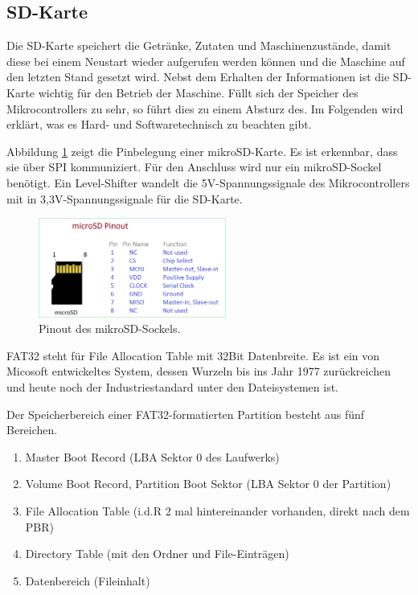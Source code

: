 \subsection{SD-Karte}
\label{subsec:SD-Karte}

Die SD-Karte speichert die Getränke, Zutaten und Maschinenzustände, damit diese bei einem Neustart wieder aufgerufen werden können und die Maschine auf den letzten Stand gesetzt wird.
Nebst dem Erhalten der Informationen ist die SD-Karte wichtig für den Betrieb der Maschine. Füllt sich der Speicher des Mikrocontrollers zu sehr, so führt dies zu einem Absturz des. Im Folgenden wird erklärt, was es Hard- und Softwaretechnisch zu beachten gibt.

Abbildung \ref{fig:micro_sd_pinout} zeigt die Pinbelegung einer mikroSD-Karte. Es ist erkennbar, dass sie über SPI kommuniziert. Für den Anschluss wird nur ein mikroSD-Sockel benötigt. Ein Level-Shifter wandelt die 5V-Spannungssignale des Mikrocontrollers mit in 3,3V-Spannungssignale für die SD-Karte.

\begin{figure}[H]
	\centering
	\includegraphics[width=0.55\textwidth]{graphics/micro-sd-pinout}
	\caption{Pinout des mikroSD-Sockels. \cite{theorycircuitcom_arduino_2018}}
	\label{fig:micro_sd_pinout}
\end{figure}

FAT32 steht für File Allocation Table mit 32Bit Datenbreite. Es ist ein von Micosoft entwickeltes System, dessen Wurzeln bis ins Jahr 1977 zurückreichen und heute noch der Industriestandard unter den Dateisystemen ist. \cite{ionosde_fat32_2020}

Der Speicherbereich einer FAT32-formatierten Partition besteht aus fünf Bereichen. \cite{milsch_aufbau_2009}
\begin{enumerate}
\item Master Boot Record (LBA Sektor 0 des Laufwerks)
\item Volume Boot Record, Partition Boot Sektor (LBA Sektor 0 der Partition)
\item File Allocation Table (i.d.R 2 mal hintereinander vorhanden, direkt nach dem PBR)
\item Directory Table (mit den Ordner und File-Einträgen)
\item Datenbereich (Fileinhalt)
\end{enumerate}

